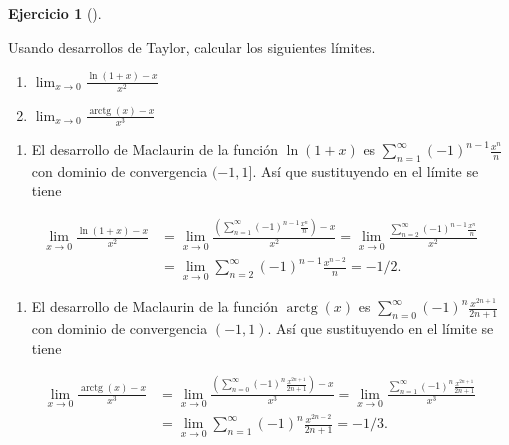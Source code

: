 \documentclass[
  spanish,
  a4paper,
]{scrreport}
\providecommand{\tightlist}{%
  \setlength{\itemsep}{0pt}\setlength{\parskip}{0pt}}
\theoremstyle{definition}
\newtheorem{exercise}{Ejercicio}[chapter]
\theoremstyle{remark}
\begin{document}
\begin{exercise}[]\protect\hypertarget{exr-limites-taylor}{}\label{exr-limites-taylor}

Usando desarrollos de Taylor, calcular los siguientes límites.

\begin{enumerate}
\def\labelenumi{\alph{enumi}.}
\item
  \(\lim_{x\to 0}\frac{\ln(1+x)-x}{x^2}\)
\item
  \(\lim_{x\to 0}\frac{\operatorname{arctg}(x)-x}{x^3}\)
\end{enumerate}

\end{exercise}

\begin{tcolorbox}[enhanced jigsaw, arc=.35mm, bottomrule=.15mm, bottomtitle=1mm, breakable, colback=white, colbacktitle=quarto-callout-tip-color!10!white, colframe=quarto-callout-tip-color-frame, coltitle=black, left=2mm, leftrule=.75mm, opacityback=0, opacitybacktitle=0.6, rightrule=.15mm, title=\textcolor{quarto-callout-tip-color}{\faLightbulb}\hspace{0.5em}{Solución}, titlerule=0mm, toprule=.15mm, toptitle=1mm]

\begin{enumerate}
\def\labelenumi{\alph{enumi}.}
\tightlist
\item
  El desarrollo de Maclaurin de la función \(\ln(1+x)\) es
  \(\sum_{n=1}^\infty (-1)^{n-1}\frac{x^n}{n}\) con dominio de
  convergencia \((-1,1]\). Así que sustituyendo en el límite se tiene
\end{enumerate}

\begin{align*}
\lim_{x\to 0}\frac{\ln(1+x)-x}{x^2} &= \lim_{x\to 0}\frac{\left(\sum_{n=1}^\infty (-1)^{n-1}\frac{x^n}{n}\right)-x}{x^2} = \lim_{x\to 0}\frac{\sum_{n=2}^\infty (-1)^{n-1}\frac{x^n}{n}}{x^2} \\
&= \lim_{x\to 0} \sum_{n=2}^\infty (-1)^{n-1}\frac{x^{n-2}}{n}
 = -1/2.
\end{align*}

\begin{enumerate}
\def\labelenumi{\alph{enumi}.}
\setcounter{enumi}{1}
\tightlist
\item
  El desarrollo de Maclaurin de la función \(\operatorname{arctg}(x)\)
  es \(\sum_{n=0}^\infty (-1)^n\frac{x^{2n+1}}{2n+1}\) con dominio de
  convergencia \((-1,1)\). Así que sustituyendo en el límite se tiene
\end{enumerate}

\begin{align*}
\lim_{x\to 0}\frac{\operatorname{arctg}(x)-x}{x^3} &= \lim_{x\to 0}\frac{\left(\sum_{n=0}^\infty (-1)^n\frac{x^{2n+1}}{2n+1}\right)-x}{x^3} = \lim_{x\to 0}\frac{\sum_{n=1}^\infty (-1)^n\frac{x^{2n+1}}{2n+1}}{x^3} \\
&= \lim_{x\to 0} \sum_{n=1}^\infty (-1)^n\frac{x^{2n-2}}{2n+1} = -1/3.
\end{align*}

\end{tcolorbox}
\end{document}

